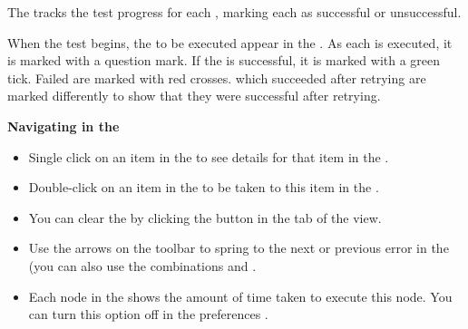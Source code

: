 % 
%
%

The \gdtestresultview{}  tracks the test progress for each \gdsuite{}, marking each \gdstep{} as successful or unsuccessful.

When the test begins, the \gdsteps{} to be executed appear in the \gdtestresultview{}. As each \gdstep{} is executed, it is marked with a question mark. If the \gdstep{} is successful, it is marked with a green tick. Failed \gdsteps{} are marked with red crosses. \gdsteps{} which succeeded after retrying  are marked differently to show that they were successful after retrying. 

\textbf{Navigating in the \gdtestresultview{}}\\
\begin{itemize}
\item Single click on an item in the \gdtestresultview{} to see details for that item in the \gdpropview{}.
\item Double-click on an item in the \gdtestresultview{} to be taken to this item in the \gdsuite{}. 
\item You can clear the \gdtestresultview{} by clicking the  button in the tab of the view. 
\item Use the arrows on the toolbar to spring to the next or previous error in the \gdtestresultview{} (you can also use the combinations  and .
\item Each node in the \gdtestresultview{} shows the amount of time taken to execute this node. You can turn this option off in the preferences .
\end{itemize}


